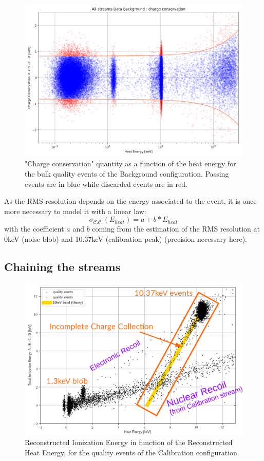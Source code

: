 \begin{figure}
\centering
\includegraphics[width=\linewidth,]{Figures/Neutron/charge_conservation.png}
\caption{"Charge conservation" quantity as a function of the heat energy for the bulk quality events of the Background configuration. Passing events are in blue while discarded events are in red.}
\label{fig:charge-conservation}
\end{figure}

As the RMS resolution depends on the energy associated to the event, it is once more necessary to model it with a linear law:
\begin{equation}
\sigma_{\mathcal{C.C.}}\left(E_{heat}\right)
=
a + b*E_{heat}
\end{equation}
with the coefficient $a$ and $b$ coming from the estimation of the RMS resolution at 0keV (noise blob) and 10.37keV (calibration peak) (precision necessary here).

\subsection{Chaining the streams}

\begin{figure}
\centering
\includegraphics[width=\linewidth,]{Figures/Neutron/ecei_plot.png}
\caption{Reconstructed Ionization Energy in function of the Reconstructed Heat Energy, for the quality events of the Calibration configuration.}
\label{fig:ecei-plot}
\end{figure}

